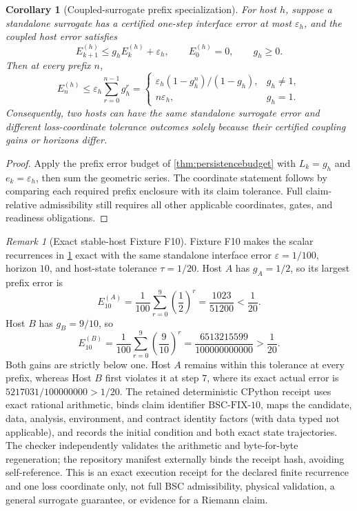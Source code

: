 \documentclass[11pt,a4paper]{article}
\theoremstyle{definition}
\theoremstyle{plain}
\newtheorem{corollary}[definition]{Corollary}
\theoremstyle{remark}
\newtheorem{remark}[definition]{Remark}
\begin{document}
\begin{corollary}[Coupled-surrogate prefix specialization]
\label{cor:coupled-surrogate}
For host \(h\), suppose a standalone surrogate has a certified one-step
interface error at most \(\varepsilon_h\), and the coupled host error satisfies
\[
E_{k+1}^{(h)}\le g_hE_k^{(h)}+\varepsilon_h,
\qquad E_0^{(h)}=0,\qquad g_h\ge0 .
\]
Then at every prefix \(n\),
\[
E_n^{(h)}
\le\varepsilon_h\sum_{r=0}^{n-1}g_h^r
=
\begin{cases}
\varepsilon_h(1-g_h^n)/(1-g_h),&g_h\ne1,\\
n\varepsilon_h,&g_h=1.
\end{cases}
\]
Consequently, two hosts can have the same standalone surrogate error and
different loss-coordinate tolerance outcomes solely because their certified
coupling gains or horizons differ.
\end{corollary}
\begin{proof}
Apply the prefix error budget of \cref{thm:persistencebudget} with
\(L_k=g_h\) and \(e_k=\varepsilon_h\), then sum the geometric series.  The
coordinate statement follows by comparing each required prefix enclosure
with its claim tolerance.  Full claim-relative admissibility still requires
all other applicable coordinates, gates, and readiness obligations.
\end{proof}

\begin{remark}[Exact stable-host Fixture F10]
\label{rem:stable-host-fixture}
Fixture F10 makes the scalar recurrences in
\cref{cor:coupled-surrogate} exact with the same standalone interface error
\(\varepsilon=1/100\), horizon \(10\), and host-state tolerance
\(\tau=1/20\).  Host \(A\) has \(g_A=1/2\), so its largest prefix error is
\[
E_{10}^{(A)}
=\frac1{100}\sum_{r=0}^{9}\left(\frac12\right)^r
=\frac{1023}{51200}<\frac1{20}.
\]
Host \(B\) has \(g_B=9/10\), so
\[
E_{10}^{(B)}
=\frac1{100}\sum_{r=0}^{9}\left(\frac9{10}\right)^r
=\frac{6513215599}{100000000000}>\frac1{20}.
\]
Both gains are strictly below one.  Host \(A\) remains within this tolerance
at every prefix, whereas Host \(B\) first violates it at step \(7\), where its
exact actual error is
\(5217031/100000000>1/20\).  The retained deterministic CPython receipt uses
exact rational arithmetic, binds claim identifier \(\mathrm{BSC\mbox{-}FIX\mbox{-}10}\),
maps the candidate, data, analysis, environment, and contract identity
factors (with data typed not applicable), and records the initial condition
and both exact state trajectories.  The checker independently validates the
arithmetic and byte-for-byte regeneration; the repository manifest
externally binds the receipt hash, avoiding self-reference.  This is an exact
execution receipt for the declared finite recurrence and one loss coordinate
only, not full BSC admissibility, physical validation, a general surrogate
guarantee, or evidence for a Riemann claim.
\end{remark}
\end{document}

